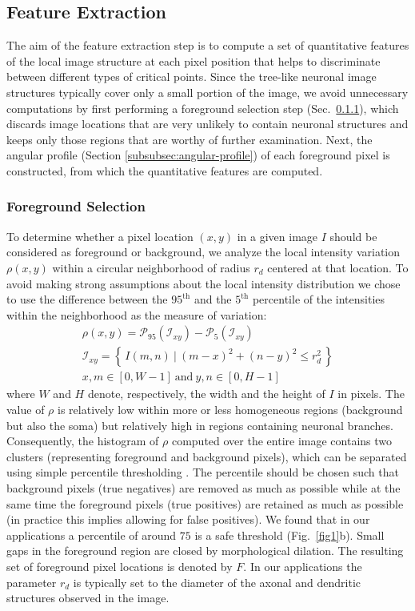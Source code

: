 \subsection{Feature Extraction}
\label{subsec:feature-extraction}
The aim of the feature extraction step is to compute a set of quantitative features of the local image structure at each pixel position that helps to discriminate between different types of critical points. Since the tree-like neuronal image structures typically cover only a small portion of the image, we avoid unnecessary computations by first performing a foreground selection step (Sec.~\ref{subsubsec:foreground-selection}), which discards image locations that are very unlikely to contain neuronal structures and keeps only those regions that are worthy of further examination. Next, the angular profile (Section \ref{subsubsec:angular-profile}) of each foreground pixel is constructed, from which the quantitative features are computed.

\subsubsection{Foreground Selection}
\label{subsubsec:foreground-selection}
To determine whether a pixel location $(x,y)$ in a given image $I$ should be considered as foreground or background, we analyze the local intensity variation $\rho(x,y)$ within a circular neighborhood of radius $r_{d}$ centered at that location. To avoid making strong assumptions about the local intensity distribution we chose to use the difference between the $95^\textrm{th}$ and the $5^\textrm{th}$ percentile of the intensities within the neighborhood as the measure of variation:
\begin{gather} 
\rho(x,y) = \mathcal{P}_{95}(\mathcal{I}_{xy}) - \mathcal{P}_{5}(\mathcal{I}_{xy}) \\
\mathcal{I}_{xy} = \left\{\, I(m,n)\ |\ (m-x)^{2}+(n-y)^{2} \leq r_d^2\, \right\} \\
x,m \in [0,W-1]\ \textrm{and}\ y,n \in [0,H-1]
\end{gather}
where $W$ and $H$ denote, respectively, the width and the height of $I$ in pixels. The value of $\rho$ is relatively low within more or less homogeneous regions (background but also the soma) but relatively high in regions containing neuronal branches. Consequently, the histogram of $\rho$ computed over the entire image contains two clusters (representing foreground and background pixels), which can be separated using simple percentile thresholding \cite{doyle1962operations}. The percentile should be chosen such that background pixels (true negatives) are removed as much as possible while at the same time the foreground pixels (true positives) are retained as much as possible (in practice this implies allowing for false positives). We found that in our applications a percentile of around $75$ is a safe threshold (Fig.~\ref{fig1}b). Small gaps in the foreground region are closed by morphological dilation. The resulting set of foreground pixel locations is denoted by $F$. In our applications the parameter $r_{d}$ is typically set to the diameter of the axonal and dendritic structures observed in the image.

